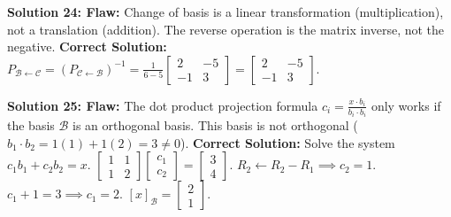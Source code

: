 \documentclass[11pt]{article}
\begin{document}
\vspace{0.5cm}
\textbf{Solution 24: Flaw:} Change of basis is a linear transformation (multiplication), not a translation (addition). The reverse operation is the matrix inverse, not the negative. \textbf{Correct Solution:}
$P_{\mathcal{B} \leftarrow \mathcal{C}} = (P_{\mathcal{C} \leftarrow \mathcal{B}})^{-1} = \frac{1}{6-5} \begin{bmatrix} 2 & -5 \\ -1 & 3 \end{bmatrix} = \begin{bmatrix} 2 & -5 \\ -1 & 3 \end{bmatrix}$.

\vspace{0.5cm}
\textbf{Solution 25: Flaw:} The dot product projection formula $c_i = \frac{x \cdot b_i}{b_i \cdot b_i}$ only works if the basis $\mathcal{B}$ is an orthogonal basis. This basis is not orthogonal ($b_1 \cdot b_2 = 1(1) + 1(2) = 3 \neq 0$). \textbf{Correct Solution:} Solve the system $c_1b_1 + c_2b_2 = x$.
$\begin{bmatrix} 1 & 1 \\ 1 & 2 \end{bmatrix} \begin{bmatrix} c_1 \\ c_2 \end{bmatrix} = \begin{bmatrix} 3 \\ 4 \end{bmatrix}$.
$R_2 \leftarrow R_2 - R_1 \implies c_2 = 1$.
$c_1 + 1 = 3 \implies c_1 = 2$.
$[x]_{\mathcal{B}} = \begin{bmatrix} 2 \\ 1 \end{bmatrix}$.
\end{document}
